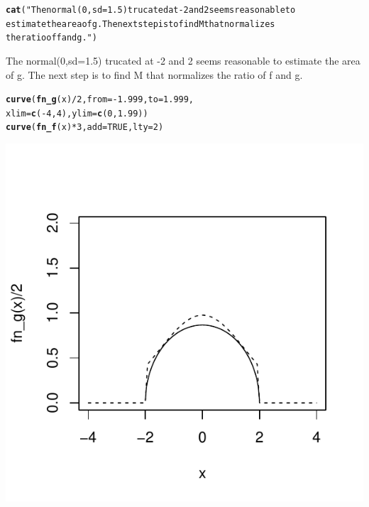 \documentclass{article}\usepackage[]{graphicx}\usepackage[]{color}
\makeatletter
\def\maxwidth{ %
  \ifdim\Gin@nat@width>\linewidth
    \linewidth
  \else
    \Gin@nat@width
  \fi
}
\newcommand{\hlnum}[1]{\textcolor[rgb]{0.686,0.059,0.569}{#1}}%
\newcommand{\hlstr}[1]{\textcolor[rgb]{0.192,0.494,0.8}{#1}}%
\newcommand{\hlopt}[1]{\textcolor[rgb]{0,0,0}{#1}}%
\newcommand{\hlstd}[1]{\textcolor[rgb]{0.345,0.345,0.345}{#1}}%
\newcommand{\hlkwc}[1]{\textcolor[rgb]{0.333,0.667,0.333}{#1}}%
\newcommand{\hlkwd}[1]{\textcolor[rgb]{0.737,0.353,0.396}{\textbf{#1}}}%
\newenvironment{kframe}{%
 \def\at@end@of@kframe{}%
 \ifinner\ifhmode%
  \def\at@end@of@kframe{\end{minipage}}%
  \begin{minipage}{\columnwidth}%
 \fi\fi%
 \def\FrameCommand##1{\hskip\@totalleftmargin \hskip-\fboxsep
 \colorbox{shadecolor}{##1}\hskip-\fboxsep
     \hskip-\linewidth \hskip-\@totalleftmargin \hskip\columnwidth}%
 \MakeFramed {\advance\hsize-\width
   \@totalleftmargin\z@ \linewidth\hsize
   \@setminipage}}%
 {\par\unskip\endMakeFramed%
 \at@end@of@kframe}
\makeatother
\begin{document}
\begin{enumerate}
{}


\begin{kframe}\begin{alltt}
\hlkwd{cat}\hlstd{(}\hlstr{"The normal(0,sd=1.5) trucated at -2 and 2 seems reasonable to 
    estimate the area of g. The next step is to find M that normalizes 
    the ratio of f and g."}\hlstd{)}
\end{alltt}
\end{kframe}The normal(0,sd=1.5) trucated at -2 and 2 seems reasonable to 
    estimate the area of g. The next step is to find M that normalizes 
    the ratio of f and g.\begin{kframe}\begin{alltt}
\hlkwd{curve}\hlstd{(}\hlkwd{fn_g}\hlstd{(x)}\hlopt{/}\hlnum{2}\hlstd{,} \hlkwc{from} \hlstd{=} \hlopt{-}\hlnum{1.999}\hlstd{,} \hlkwc{to} \hlstd{=} \hlnum{1.999}\hlstd{,}
      \hlkwc{xlim} \hlstd{=} \hlkwd{c}\hlstd{(}\hlopt{-}\hlnum{4}\hlstd{,}\hlnum{4}\hlstd{),} \hlkwc{ylim} \hlstd{=} \hlkwd{c}\hlstd{(}\hlnum{0}\hlstd{,}\hlnum{1.99}\hlstd{))}
\hlkwd{curve}\hlstd{(}\hlkwd{fn_f}\hlstd{(x)}\hlopt{*}\hlnum{3}\hlstd{,} \hlkwc{add}\hlstd{=}\hlnum{TRUE}\hlstd{,} \hlkwc{lty}\hlstd{=}\hlnum{2}\hlstd{)}
\end{alltt}
\end{kframe}

{\centering \includegraphics[width=\maxwidth]{figure/prob5-2} 

}
\end{enumerate}
\end{document}
